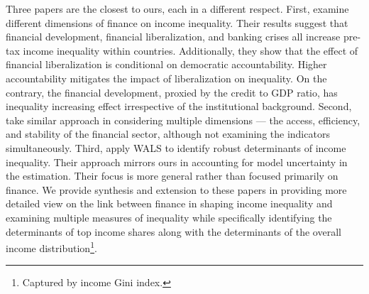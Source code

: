 \documentclass[preprint, nonatbib, 10pt]{elsarticle}
\begin{document}
Three papers are the closest to ours, each in a different respect. First, \textcite{de2017finance} examine different dimensions of finance on income inequality. Their results suggest that financial development, financial liberalization, and banking crises all increase pre-tax income inequality within countries. Additionally, they show that the effect of financial liberalization is conditional on democratic accountability. Higher accountability mitigates the impact of liberalization on inequality. On the contrary, the financial development, proxied by the credit to GDP ratio, has inequality increasing effect irrespective of the institutional background. Second, \textcite{naceurzhang2016} take similar approach in considering multiple dimensions --- the access, efficiency, and stability of the financial sector, although not examining the indicators simultaneously.  Third, \textcite{furceri2019robust} apply \ac{WALS} to identify robust determinants of income inequality. Their approach mirrors ours in accounting for model uncertainty in the estimation. Their focus is more general rather than focused primarily on finance. We provide synthesis and extension to these papers in providing more detailed view on the link between finance in shaping income inequality and examining multiple measures of inequality while specifically identifying the determinants of top income shares along with the determinants of the overall income distribution\footnote{Captured by income Gini index.}.


\end{document}
